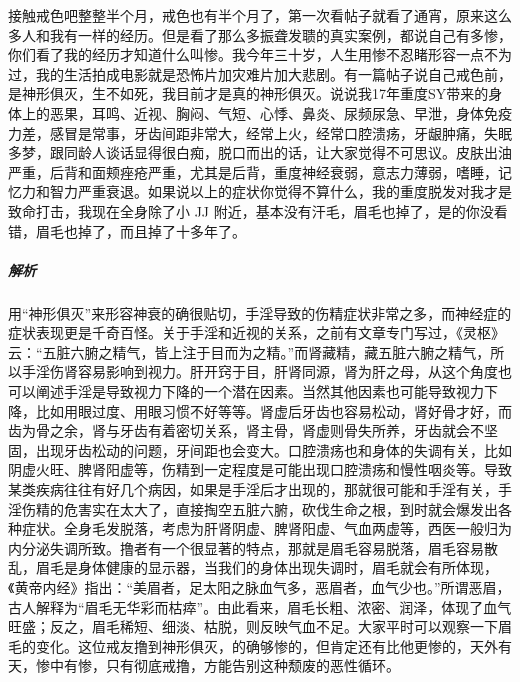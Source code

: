 \begin{case}[神经衰弱]
    接触戒色吧整整半个月，戒色也有半个月了，第一次看帖子就看了通宵，原来这么多人和我有一样的经历。但是看了那么多振聋发聩的真实案例，都说自己有多惨，你们看了我的经历才知道什么叫惨。我今年三十岁，人生用惨不忍睹形容一点不为过，我的生活拍成电影就是恐怖片加灾难片加大悲剧。有一篇帖子说自己戒色前，是神形俱灭，生不如死，我目前才是真的神形俱灭。说说我17年重度SY带来的身体上的恶果，耳鸣、近视、胸闷、气短、心悸、鼻炎、尿频尿急、早泄，身体免疫力差，感冒是常事，牙齿间距非常大，经常上火，经常口腔溃疡，牙龈肿痛，失眠多梦，跟同龄人谈话显得很白痴，脱口而出的话，让大家觉得不可思议。皮肤出油严重，后背和面颊痤疮严重，尤其是后背，重度神经衰弱，意志力薄弱，嗜睡，记忆力和智力严重衰退。如果说以上的症状你觉得不算什么，我的重度脱发对我才是致命打击，我现在全身除了小 JJ 附近，基本没有汗毛，眉毛也掉了，是的你没看错，眉毛也掉了，而且掉了十多年了。
    \subparagraph{解析} 用“神形俱灭”来形容神衰的确很贴切，手淫导致的伤精症状非常之多，而神经症的症状表现更是千奇百怪。关于手淫和近视的关系，之前有文章专门写过，《灵枢》云：“五脏六腑之精气，皆上注于目而为之精。”而肾藏精，藏五脏六腑之精气，所以手淫伤肾容易影响到视力。肝开窍于目，肝肾同源，肾为肝之母，从这个角度也可以阐述手淫是导致视力下降的一个潜在因素。当然其他因素也可能导致视力下降，比如用眼过度、用眼习惯不好等等。肾虚后牙齿也容易松动，肾好骨才好，而齿为骨之余，肾与牙齿有着密切关系，肾主骨，肾虚则骨失所养，牙齿就会不坚固，出现牙齿松动的问题，牙间距也会变大。口腔溃疡也和身体的失调有关，比如阴虚火旺、脾肾阳虚等，伤精到一定程度是可能出现口腔溃疡和慢性咽炎等。导致某类疾病往往有好几个病因，如果是手淫后才出现的，那就很可能和手淫有关，手淫伤精的危害实在太大了，直接掏空五脏六腑，砍伐生命之根，到时就会爆发出各种症状。全身毛发脱落，考虑为肝肾阴虚、脾肾阳虚、气血两虚等，西医一般归为内分泌失调所致。撸者有一个很显著的特点，那就是眉毛容易脱落，眉毛容易散乱，眉毛是身体健康的显示器，当我们的身体出现失调时，眉毛就会有所体现，《黄帝内经》指出：“美眉者，足太阳之脉血气多，恶眉者，血气少也。”所谓恶眉，古人解释为“眉毛无华彩而枯瘁”。由此看来，眉毛长粗、浓密、润泽，体现了血气旺盛；反之，眉毛稀短、细淡、枯脱，则反映气血不足。大家平时可以观察一下眉毛的变化。这位戒友撸到神形俱灭，的确够惨的，但肯定还有比他更惨的，天外有天，惨中有惨，只有彻底戒撸，方能告别这种颓废的恶性循环。
\end{case}

